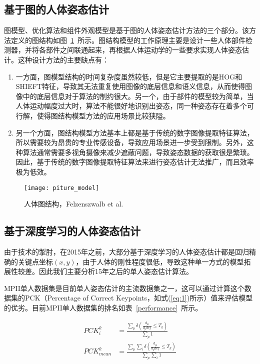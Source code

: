 \subsection{基于图的人体姿态估计}

图模型、优化算法和组件外观模型是基于图的人体姿态估计方法的三个部分。该方法定义的图结构如图~\ref{piture:3}~所示。图结构模型的工作原理主要是设计一些人体部件检测器，并将各部件之间联通起来，再根据人体运动学的一些要求实现人体姿态估计。这种设计方法的主要缺点有：

\begin{enumerate}
\item 一方面，图模型结构的时间复杂度虽然较低，但是它主要提取的是HOG和SHIEFT特征，导致其无法重复使用图像的底层信息和语义信息，从而使得图像中的底层信息对于算法的制约很大。另一个，由于部件的模型较为简单，当人体运动幅度过大时，算法不能很好地识别出姿态，同一种姿态存在着多个可行解，使得图结构模型方法的应用场景比较狭隘。

\item 另一个方面，图结构模型方法基本上都是基于传统的数字图像提取特征算法，所以需要较为昂贵的专业传感设备，导致应用场景进一步受到限制。另外，这种算法通常需要多视角摄像来减少遮蔽问题，导致姿态数据的获取很是繁琐。因此，基于传统的数字图像提取特征算法来进行姿态估计无法推广，而且效率极为低效。
\end{enumerate}

\begin{figure}[h]
\centering
\texttt{[image: piture\_model]}
\caption{人体图结构，Felzenszwalb et al.}
\label{piture:3}
\end{figure}

\subsection{基于深度学习的人体姿态估计}

由于技术的掣肘，在2015年之前，大部分基于深度学习的人体姿态估计都是回归精确的关键点坐标$(x,y)$，由于人体的刚性程度很低，导致这种单一方式的模型拓展性较差。因此我们主要分析15年之后的单人姿态估计算法。

MPII单人数据集是目前单人姿态估计的主流数据集之一，这可以通过计算这个数据集的PCK（Percentage of Correct Keypoints，如式(\ref{eq:1})所示）值来评估模型的优劣。目前MPII单人数据集的排名如表~\ref{performance}~所示。

\begin{equation}
\label{eq:1}
\begin{aligned}
PCK_{i}^{k}&=\frac{\sum_{p}\delta(\frac{d_{pi}}{d_{p}{def}}\leqslant T_{k})}{\sum_{p}1}\\
PCK_{mean}^{k}&=\frac{\sum_{p}\sum_{i}\delta(\frac{d_{pi}}{d_{p}{def}}\leqslant T_{k})}{\sum_{p}\sum_{i}1}
\end{aligned}
\end{equation}

